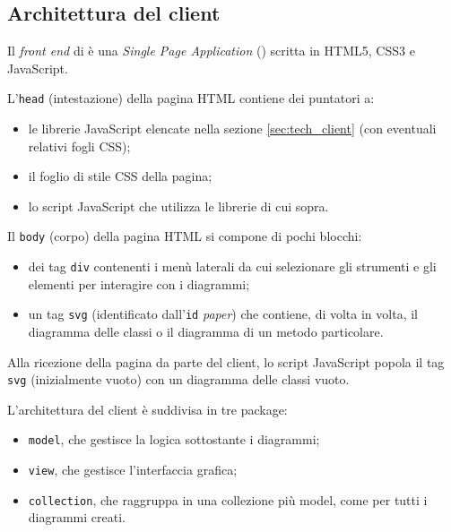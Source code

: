 \subsection{Architettura del client} \label{sec:arch_client}
Il \emph{front end} di \proj{} è una \emph{Single Page Application} () scritta in HTML5, CSS3 e JavaScript.

L'\texttt{head} (intestazione) della pagina HTML contiene dei puntatori a:
\begin{itemize}
	\item le librerie JavaScript elencate nella sezione \ref{sec:tech_client} (con eventuali relativi fogli CSS);
	\item il foglio di stile CSS della pagina;
	\item lo script JavaScript che utilizza le librerie di cui sopra.
\end{itemize}

Il \texttt{body} (corpo) della pagina HTML si compone di pochi blocchi:
\begin{itemize}
	\item dei tag \texttt{div} contenenti i menù laterali da cui selezionare gli strumenti e gli elementi per interagire con i diagrammi;
	\item un tag \texttt{svg} (identificato dall'\texttt{id} \emph{paper}) che contiene, di volta in volta, il diagramma delle classi o il diagramma di un metodo particolare.
\end{itemize}
Alla ricezione della pagina da parte del client, lo script JavaScript popola il tag \texttt{svg} (inizialmente vuoto) con un diagramma delle classi vuoto.

L'architettura del client è suddivisa in tre package:
\begin{itemize}
	\item \texttt{model}, che gestisce la logica sottostante i diagrammi;
	\item \texttt{view}, che gestisce l'interfaccia grafica;
	\item \texttt{collection}, che raggruppa in una collezione più model, come per tutti i diagrammi creati.
\end{itemize}





